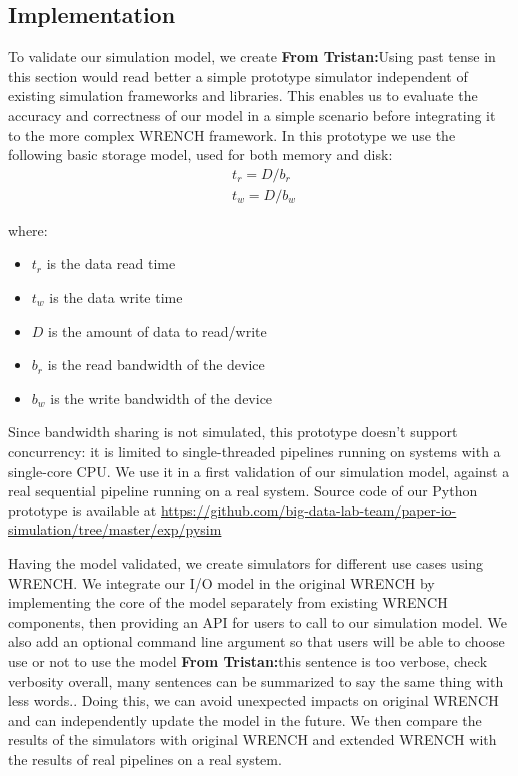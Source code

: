 \documentclass[conference]{IEEEtran}
\newcommand{\tristan}[1]{\color{orange}\textbf{From Tristan:}#1\color{black}}
\begin{document}
		\subsection{Implementation}

			To validate our simulation model, we create \tristan{Using past tense in this section would read better} a simple prototype
			simulator independent of existing simulation frameworks and libraries. 
			This enables us to evaluate the accuracy and correctness of our 
			model in a simple scenario before integrating it to the more complex WRENCH framework. 
			In this prototype we use the following basic storage model, used for both memory and disk: 
			\begin{align*}
				& t_{r} = D / b_r \\ 
				& t_{w} = D / b_w\
			\end{align*}		
			
			where:
			\begin{itemize}
				\item $t_{r}$ is the data read time
				\item $t_{w}$ is the data write time
				\item $D$ is the amount of data to read/write
				\item $b_r$ is the read bandwidth of the device
				\item $b_w$ is the write bandwidth of the device
			\end{itemize}			

			Since bandwidth sharing is not simulated, this prototype doesn't support 
			concurrency: it is limited to single-threaded pipelines running on systems 
			with a single-core CPU. We use it in a first validation of our simulation 
			model, against a real sequential pipeline running on a real system.
			Source code of our Python prototype is available at 
            \url{https://github.com/big-data-lab-team/paper-io-simulation/tree/master/exp/pysim}
			
			Having the model validated, we create simulators for different use cases 
			using WRENCH.
			We integrate our I/O model in the original WRENCH by implementing 
			the core of the model separately from existing WRENCH components, 
			then providing an API for users to call to our simulation model. 
			We also add an optional command line argument so that users will be able 
			to choose use or not to use the model \tristan{this sentence is too verbose, check verbosity overall, many 
			sentences can be summarized to say the same thing with less words.}. Doing this, we can avoid 
			unexpected impacts on original WRENCH and can independently update 
			the model in the future. 
			We then compare the results of the simulators with
			original WRENCH and extended WRENCH with the results of real
			pipelines on a real system. 
		
\end{document}
